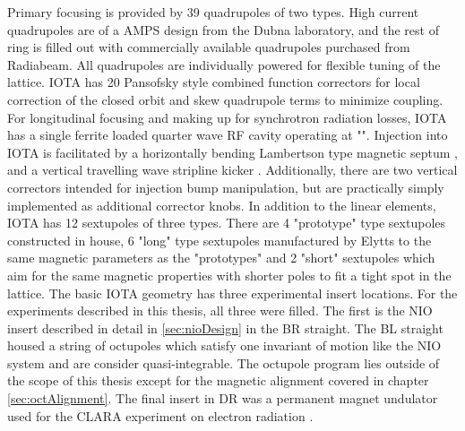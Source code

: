 Primary focusing is provided by 39 quadrupoles of two types. High current quadrupoles are of a AMPS design from the Dubna laboratory, and the rest of ring is filled out with commercially available quadrupoles purchased from Radiabeam. All quadrupoles are individually powered for flexible tuning of the lattice. IOTA has 20 Pansofsky \cite{handMagneticQuadrupoleRectangular1959} style combined function correctors for local correction of the closed orbit and skew quadrupole terms to minimize coupling. For longitudinal focusing and making up for synchrotron radiation losses, IOTA has a single ferrite loaded quarter wave RF cavity operating at "". Injection into IOTA is facilitated by a horizontally bending Lambertson type magnetic septum \cite{lambertsonChargedParticleExtracting1967}, and a vertical travelling wave stripline kicker \cite{antipovStriplineKickerIntegrable2016}. Additionally, there are two vertical correctors intended for injection bump manipulation, but are practically simply implemented as additional corrector knobs. In addition to the linear elements, IOTA has 12 sextupoles of three types. There are 4 "prototype" type sextupoles constructed in house, 6 "long" type sextupoles manufactured by Elytts to the same magnetic parameters as the "prototypes" and 2 "short" sextupoles which aim for the same magnetic properties with shorter poles to fit a tight spot in the lattice. The basic IOTA geometry has three experimental insert locations. For the experiments described in this thesis, all three were filled. The first is the NIO insert described in detail in \ref{sec:nioDesign} in the BR straight. The BL straight housed a string of octupoles which satisfy one invariant of motion like the NIO system and are consider quasi-integrable. The octupole program lies outside of the scope of this thesis except for the magnetic alignment covered in chapter \ref{sec:octAlignment}. The final insert in DR was a permanent magnet undulator used for the CLARA experiment on electron radiation \cite{stancariUndulatorRadiationSingle2024}. 

